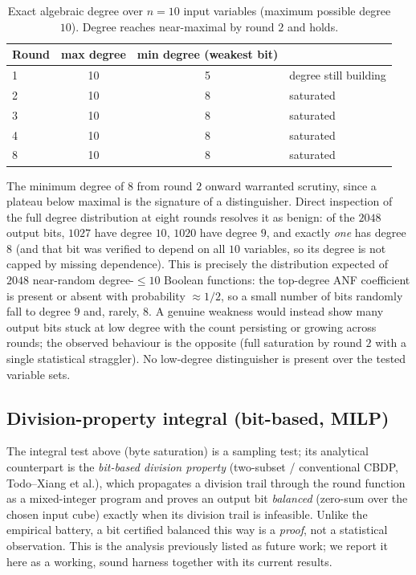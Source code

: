 \documentclass[11pt]{article}
\begin{document}
\begin{table}[h]
\centering
\begin{tabular}{lccl}
  \toprule
  \textbf{Round} & \textbf{max degree} & \textbf{min degree (weakest bit)} & \textbf{} \\
  \midrule
  1 & 10 & 5 & degree still building \\
  2 & 10 & 8 & saturated \\
  3 & 10 & 8 & saturated \\
  4 & 10 & 8 & saturated \\
  8 & 10 & 8 & saturated \\
  \bottomrule
\end{tabular}
\caption{Exact algebraic degree over $n=10$ input variables (maximum possible
degree $10$). Degree reaches near-maximal by round $2$ and holds.}
\end{table}

The minimum degree of $8$ from round $2$ onward warranted scrutiny, since a
plateau below maximal is the signature of a distinguisher. Direct inspection of
the full degree distribution at eight rounds resolves it as benign: of the $2048$
output bits, $1027$ have degree $10$, $1020$ have degree $9$, and exactly
\emph{one} has degree $8$ (and that bit was verified to depend on all $10$
variables, so its degree is not capped by missing dependence). This is precisely
the distribution expected of $2048$ near-random degree-$\le 10$ Boolean functions:
the top-degree ANF coefficient is present or absent with probability $\approx
1/2$, so a small number of bits randomly fall to degree $9$ and, rarely, $8$. A
genuine weakness would instead show many output bits stuck at low degree with the
count persisting or growing across rounds; the observed behaviour is the opposite
(full saturation by round $2$ with a single statistical straggler). No
low-degree distinguisher is present over the tested variable sets.

\subsection{Division-property integral (bit-based, MILP)}
\label{sec:divprop}
The integral test above (byte saturation) is a sampling test; its analytical
counterpart is the \emph{bit-based division property} (two-subset / conventional
CBDP, Todo--Xiang et al.), which propagates a division trail through the round
function as a mixed-integer program and proves an output bit \emph{balanced}
(zero-sum over the chosen input cube) exactly when its division trail is
infeasible. Unlike the empirical battery, a bit certified balanced this way is a
\emph{proof}, not a statistical observation. This is the analysis previously
listed as future work; we report it here as a working, sound harness together
with its current results.
\end{document}

